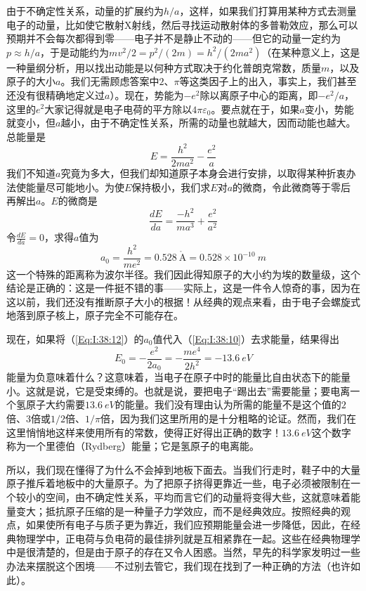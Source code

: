 由于不确定性关系，动量的扩展约为$h/a$，这样，如果我们打算用某种方式去测量电子的动量，比如使它散射X射线，然后寻找运动散射体的多普勒效应，那么可以预期并不会每次都得到零——电子并不是静止不动的——但它的动量一定约为$p\approx h/a$，于是动能约为$mv^2/2=p^2/(2m)=h^2/(2ma^2)$（在某种意义上，这是一种量纲分析，用以找出动能是以何种方式取决于约化普朗克常数，质量$m$，以及原子的大小$a$。我们无需顾虑答案中$2$、$\pi$等这类因子上的出入，事实上，我们甚至还没有很精确地定义过$a$）。现在，势能为$-e^2$除以离原子中心的距离，即$-e^2/a$，这里的$e^2$大家记得就是电子电荷的平方除以$4\pi\varepsilon_0$。要点就在于，如果$a$变小，势能就变小，但$a$越小，由于不确定性关系，所需的动量也就越大，因而动能也越大。总能量是
\begin{equation}
    \label{Eq:I:38:10}
    E = \frac{h^2}{2ma^2} - \frac{e^2}{a}
\end{equation}
我们不知道$a$究竟为多大，但我们却知道原子本身会进行安排，以取得某种折衷办法使能量尽可能地小。为使$E$保持极小，我们求$E$对$a$的微商，令此微商等于零后再解出$a$。$E$的微商是
\begin{equation}
    \label{Eq:I:38:11}
    \frac{dE}{da} = \frac{-h^2}{ma^3} + \frac{e^2}{a^2}
\end{equation}
令$\frac{dE}{da} = 0$，求得$a$值为
\begin{equation}
    \label{Eq:I:38:12}
    a_0 = \frac{h^2}{me^2} = 0.528~\mathring{\text{A}} = 0.528 \times 10^{-10}~m
\end{equation}
这一个特殊的距离称为波尔半径。我们因此得知原子的大小约为埃的数量级，这个结论是正确的：这是一件挺不错的事——实际上，这是一件令人惊奇的事，因为在这以前，我们还没有推断原子大小的根据！从经典的观点来看，由于电子会螺旋式地落到原子核上，原子完全不可能存在。

现在，如果将（\ref{Eq:I:38:12}）的$a_0$值代入（\ref{Eq:I:38:10}）去求能量，结果得出
\begin{equation}
    \label{Eq:I:38:13}
    E_0 = -\frac{e^2}{2a_0} = -\frac{me^4}{2h^2} = -13.6~eV
\end{equation}
能量为负意味着什么？这意味着，当电子在原子中时的能量比自由状态下的能量小。这就是说，它是受束缚的。也就是说，要把电子“踢出去”需要能量；要电离一个氢原子大约需要$13.6~eV$的能量。我们没有理由认为所需的能量不是这个值的$2$倍、$3$倍或$1/2$倍、$1/\pi$倍，因为我们这里所用的是十分粗略的论证。然而，我们在这里悄悄地这样来使用所有的常数，使得正好得出正确的数字！$13.6~eV$这个数字称为一个里德伯（Rydberg）能量；它是氢原子的电离能。

所以，我们现在懂得了为什么不会掉到地板下面去。当我们行走时，鞋子中的大量原子推斥着地板中的大量原子。为了把原子挤得更靠近一些，电子必须被限制在一个较小的空间，由不确定性关系，平均而言它们的动量将变得大些，这就意味着能量变大；抵抗原子压缩的是一种量子力学效应，而不是经典效应。按照经典的观点，如果使所有电子与质子更为靠近，我们应预期能量会进一步降低，因此，在经典物理学中，正电荷与负电荷的最佳排列就是互相紧靠在一起。这些在经典物理学中是很清楚的，但是由于原子的存在又令人困惑。当然，早先的科学家发明过一些办法来摆脱这个困境——不过别去管它，我们现在找到了一种正确的方法（也许如此）。

